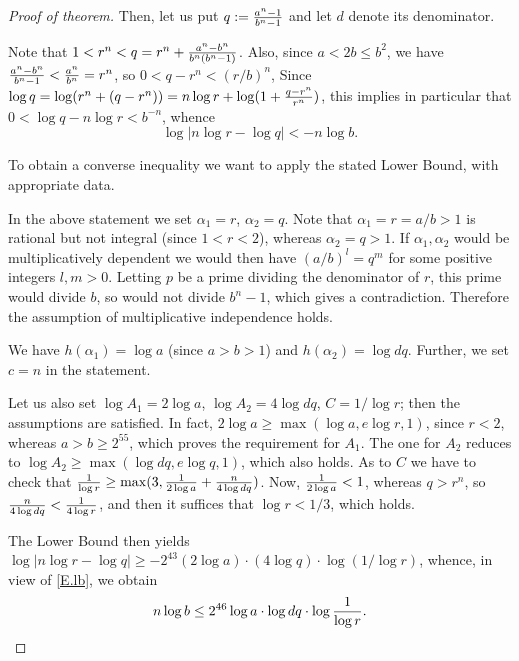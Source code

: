 \documentclass[leqno,12pt]{article} %
\theoremstyle{plain} %
\theoremstyle{definition} %
\begin{document}
\begin{proof} [Proof of theorem]
Then, let us  put $q:={a^n-1\over b^n-1}$  and let $d$ denote its denominator.

\medskip

Note that  $1<r^n<q=r^n+{a^n-b^n\over b^n(b^n-1)}$. Also, since $a<2b\le b^2$, we have  ${a^n-b^n\over b^n-1}<{a^n\over b^n}=r^n$, so 
 $0<q-r^n<(r/b)^n$, 
Since  $\log q=\log (r^n+(q-r^n))=n\log r+\log (1+{q-r^n\over r^n})$, this implies in particular that $0<\log q-n\log r<b^{-n}$, whence
\begin{equation}\label{E.lb}
\log |n\log r-\log q|<-n\log b.
\end{equation}



To obtain a converse inequality we want to apply the stated Lower Bound, with appropriate data.




In the above statement we set $\alpha_1=r$, $\alpha_2=q$. Note that $\alpha_1=r=a/b>1$ is rational but not integral (since $1<r<2$), %
whereas $\alpha_2=q>1$. %
If $\alpha_1,\alpha_2$ would be multiplicatively dependent we would then  have $(a/b)^l=q^m$ for some positive   integers  $l,m>0$. Letting $p$ be a prime dividing the denominator of $r$, this prime would divide $b$, so would not divide $b^n-1$, which gives a contradiction. Therefore  the assumption of multiplicative independence holds.


\medskip

We have $h(\alpha_1)=\log a$ (since $a>b>1$) and  $h(\alpha_2)=\log dq$.    Further, we set $c=n$ in the statement. 

Let us  also set $\log A_1=2\log a$, $\log A_2=4\log dq$, $C=1/\log r$; then the assumptions are satisfied.  In fact,  $2\log a\ge \max (\log a,e\log r,1)$, since $r<2$, whereas $a>b\ge 2^{55}$, which proves the requirement for $A_1$. The one for $A_2$  reduces to  $\log A_2\ge \max(\log dq, e\log q, 1)$, which also holds.
As to  $C$ we have to check that ${1\over \log r}\ge \max (3, {1\over 2\log a}+{n\over 4\log dq})$. Now, ${1\over 2\log a}<1$, whereas $q>r^n$, so ${n\over 4\log dq}<{1\over 4\log r}$, and then  it suffices   that $\log r<1/3$, which holds. 

\medskip


 
The Lower Bound  then yields $\log |n\log r-\log q|\ge -2^{43}(2\log a)\cdot (4\log q)\cdot \log(1/\log r)$, whence, in view of \eqref{E.lb}, we obtain 
\begin{equation*}
n\log b\le  2^{46}\log a\cdot \log dq \cdot \log {1\over \log r}. 
\end{equation*} 


\end{proof}
\end{document}
